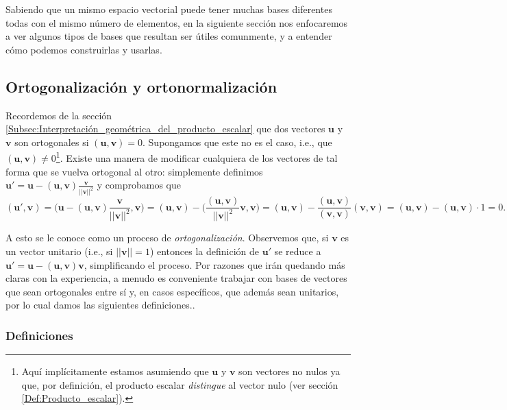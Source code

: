 \documentclass[12pt]{article}
\begin{document}
Sabiendo que un mismo espacio vectorial puede tener muchas bases diferentes \textemdash todas con el mismo número de elementos\textemdash \hspace{1mm}, en la siguiente sección nos enfocaremos a ver algunos tipos de bases que resultan ser útiles comunmente, y a entender cómo podemos construirlas y usarlas.

\subsection{Ortogonalización y ortonormalización}

Recordemos de la sección \ref{Subsec:Interpretación_geométrica_del_producto_escalar} que dos vectores $\mathbf{u}$ y $\mathbf{v}$ son ortogonales si $(\mathbf{u},\mathbf{v})=0$. Supongamos que este no es el caso, i.e., que $(\mathbf{u},\mathbf{v})\neq 0$\footnote{Aquí implícitamente estamos asumiendo que $\mathbf{u}$ y $\mathbf{v}$ son vectores no nulos ya que, por definición, el producto escalar \emph{distingue} al vector nulo (ver sección \ref{Def:Producto_escalar}).}. Existe una manera de modificar cualquiera de los vectores de tal forma que se vuelva ortogonal al otro: simplemente definimos $\mathbf{u'}=\mathbf{u}-(\mathbf{u},\mathbf{v})\frac{\mathbf{v}}{||\mathbf{v}||^2}$ y comprobamos que $$(\mathbf{u'},\mathbf{v})=\big(\mathbf{u}-(\mathbf{u},\mathbf{v})\frac{\mathbf{v}}{||\mathbf{v}||^2},\mathbf{v}\big)=(\mathbf{u},\mathbf{v})-\big(\frac{(\mathbf{u},\mathbf{v})}{||\mathbf{v}||^2}\mathbf{v},\mathbf{v}\big)=(\mathbf{u},\mathbf{v})-\frac{(\mathbf{u},\mathbf{v})}{(\mathbf{v},\mathbf{v})}(\mathbf{v},\mathbf{v})=(\mathbf{u},\mathbf{v})-(\mathbf{u},\mathbf{v})\cdot 1=0.$$ 

A esto se le conoce como un proceso de \emph{ortogonalización}. Observemos que, si $\mathbf{v}$ es un vector unitario (i.e., si $||\mathbf{v}||=1$) entonces la definición de $\mathbf{u'}$ se reduce a $\mathbf{u'}=\mathbf{u}-(\mathbf{u},\mathbf{v})\mathbf{v}$, simplificando el proceso. Por razones que irán quedando más claras con la experiencia, a menudo es conveniente trabajar con bases de vectores que sean ortogonales entre sí y, en casos específicos, que además sean unitarios, por lo cual damos las siguientes definiciones..

\subsubsection{Definiciones}
\end{document}
